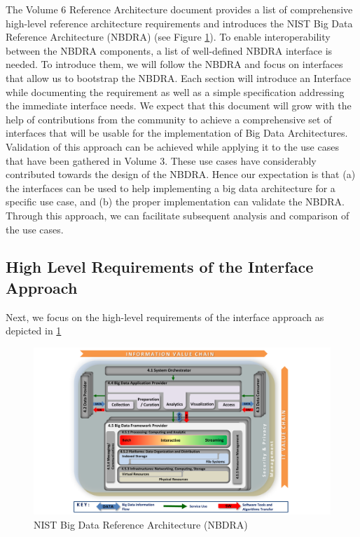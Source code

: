 \documentclass[10pt]{article}
\begin{document}
The Volume 6 Reference Architecture document provides a list of comprehensive high-level reference architecture requirements and introduces the NIST Big Data Reference Architecture (NBDRA) (see Figure \ref{F:architecture}). To enable interoperability between the NBDRA components, a list of well-defined NBDRA interface is needed.  To introduce them, we will follow the NBDRA and focus on interfaces that allow us to bootstrap the NBDRA. Each section will introduce an Interface while documenting the requirement as well as a simple specification addressing the immediate interface needs. We expect that this document will grow with the help of contributions from the community to achieve a comprehensive set of interfaces that will be usable for the implementation of Big Data Architectures. Validation of this approach can be achieved while applying it to the use cases that have been gathered in Volume 3. These use cases have considerably contributed towards the design of the NBDRA. Hence our expectation is that (a) the interfaces can be used to help implementing a big data architecture for a specific use case, and (b) the proper implementation can validate the NBDRA. Through this approach, we can facilitate subsequent analysis and comparison of the use cases. 


\subsection{High Level Requirements of the Interface Approach}

Next, we focus on the high-level requirements of the interface approach as depicted in \ref{F:architecture}

\begin{figure}[h]\centering
\includegraphics[width=1.1\textwidth]{images/vol8-diagrams}
\caption{NIST Big Data Reference Architecture (NBDRA)}
\label{F:architecture}
\end{figure}
\end{document}
